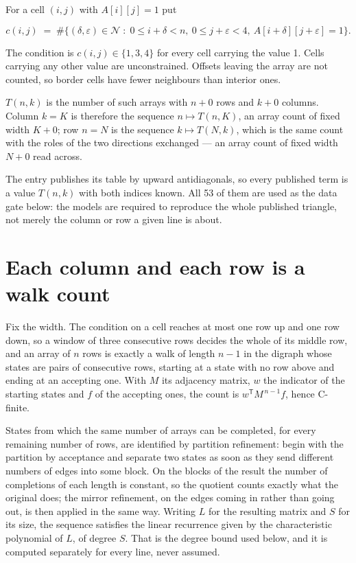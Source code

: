 \documentclass[11pt]{article}
\theoremstyle{definition}
\begin{document}
For a cell $(i,j)$ with $A[i][j] = 1$ put

\[c(i,j) \;=\; \#\bigl\{(\delta,\varepsilon)\in\mathcal{N} \;:\; 0\le i+\delta<n,\ 0\le j+\varepsilon<4,\ A[i+\delta][j+\varepsilon] = 1\bigr\}.\]

The condition is $c(i,j) \in \{1, 3, 4\}$ for every cell carrying the value 1. Cells carrying any other value are unconstrained. Offsets leaving the array are not counted, so border cells have fewer neighbours than interior ones.

$T(n,k)$ is the number of such arrays with $n + 0$ rows and $k + 0$ columns. Column $k = K$ is therefore the sequence $n \mapsto T(n,K)$, an array count of fixed width $K + 0$; row $n = N$ is the sequence $k \mapsto T(N,k)$, which is the same count with the roles of the two directions exchanged --- an array count of fixed width $N + 0$ read across.

The entry publishes its table by upward antidiagonals, so every published term is a value $T(n,k)$ with both indices known. All 53 of them are used as the data gate below: the models are required to reproduce the whole published triangle, not merely the column or row a given line is about.

\section{Each column and each row is a walk count}

Fix the width. The condition on a cell reaches at most one row up and one row down, so a window of three consecutive rows decides the whole of its middle row, and an array of $n$ rows is exactly a walk of length $n-1$ in the digraph whose states are pairs of consecutive rows, starting at a state with no row above and ending at an accepting one. With $M$ its adjacency matrix, $w$ the indicator of the starting states and $f$ of the accepting ones, the count is $w^{\mathsf T}M^{\,n-1}f$, hence C-finite.

States from which the same number of arrays can be completed, for every remaining number of rows, are identified by partition refinement: begin with the partition by acceptance and separate two states as soon as they send different numbers of edges into some block. On the blocks of the result the number of completions of each length is constant, so the quotient counts exactly what the original does; the mirror refinement, on the edges coming in rather than going out, is then applied in the same way. Writing $L$ for the resulting matrix and $S$ for its size, the sequence satisfies the linear recurrence given by the characteristic polynomial of $L$, of degree $S$. That is the degree bound used below, and it is computed separately for every line, never assumed.
\end{document}

